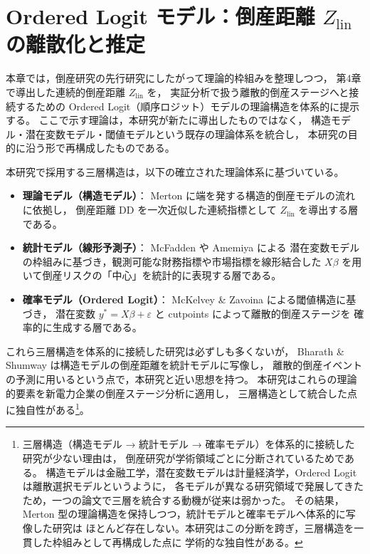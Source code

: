 
\chapter{Ordered Logit モデル：倒産距離 $Z_{\text{lin}}$ の離散化と推定}
\label{chap:ordered_logit}

\graphicspath{{figures/}}

本章では，倒産研究の先行研究にしたがって理論的枠組みを整理しつつ，
第4章で導出した連続的倒産距離 $Z_{\text{lin}}$ を，
実証分析で扱う離散的倒産ステージへと接続するための
Ordered Logit（順序ロジット）モデルの理論構造を体系的に提示する。
ここで示す理論は，本研究が新たに導出したものではなく，
構造モデル・潜在変数モデル・閾値モデルという既存の理論体系を統合し，
本研究の目的に沿う形で再構成したものである。

本研究で採用する三層構造は，以下の確立された理論体系に基づいている。

\begin{itemize}
    \item \textbf{理論モデル（構造モデル）}：  
    Merton \parencite{Merton1974} に端を発する構造的倒産モデルの流れに依拠し，
    倒産距離 DD を一次近似した連続指標として $Z_{\text{lin}}$ を導出する層である。

    \item \textbf{統計モデル（線形予測子）}：  
    McFadden \parencite{McFadden1974} や Amemiya \parencite{Amemiya1981} による
    潜在変数モデルの枠組みに基づき，観測可能な財務指標や市場指標を線形結合した
    $X\beta$ を用いて倒産リスクの「中心」を統計的に表現する層である。

    \item \textbf{確率モデル（Ordered Logit）}：  
    McKelvey \& Zavoina \parencite{McKelveyZavoina1975} による閾値構造に基づき，
    潜在変数 $y^* = X\beta + \varepsilon$ と cutpoints によって離散的倒産ステージを
    確率的に生成する層である。
\end{itemize}

これら三層構造を体系的に接続した研究は必ずしも多くないが，
Bharath \& Shumway \parencite{Bharath2008} は構造モデルの倒産距離を統計モデルに写像し，
離散的倒産イベントの予測に用いるという点で，本研究と近い思想を持つ。
本研究はこれらの理論的要素を新電力企業の倒産ステージ分析に適用し，
三層構造として統合した点に独自性がある\footnote{
三層構造（構造モデル → 統計モデル → 確率モデル）を体系的に接続した研究が少ない理由は，
倒産研究が学術領域ごとに分断されているためである。
構造モデルは金融工学，潜在変数モデルは計量経済学，Ordered Logit は離散選択モデルというように，
各モデルが異なる研究領域で発展してきたため，一つの論文で三層を統合する動機が従来は弱かった。
その結果，Merton 型の理論構造を保持しつつ，統計モデルと確率モデルへ体系的に写像した研究は
ほとんど存在しない。本研究はこの分断を跨ぎ，三層構造を一貫した枠組みとして再構成した点に
学術的な独自性がある。
}。

